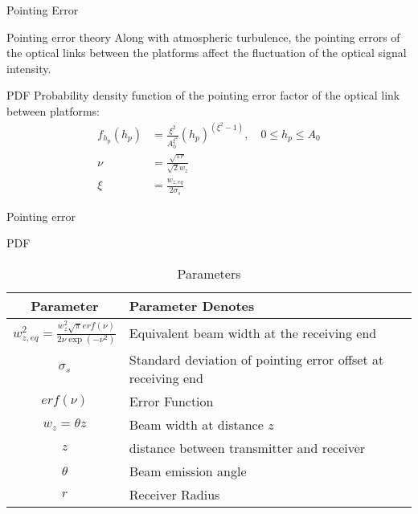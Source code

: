 \documentclass{beamer}
\begin{document}
\begin{frame}{Pointing Error}
    \begin{block}{Pointing error theory}
    Along with atmospheric turbulence, the pointing errors of the optical links between the platforms affect the fluctuation of the optical signal intensity.
    \end{block}
    \begin{block}{PDF}
    Probability density function of the pointing error factor of the optical link between platforms:
    \begin{align}
        f_{h_p}(h_p)&=\frac{\xi^2}{A_0^{\xi^2}}(h_p)^{(\xi^2-1)}, \quad {0\leq h_p \leq A_0}\\
        \nu&=\frac{\sqrt{\pi r}}{\sqrt{2}w_z}\\
    \xi &= \frac{w_{z,eq}}{2\sigma_s}
    \end{align}
    \end{block}
\end{frame}
\begin{frame}{Pointing error}
\begin{block}{PDF}
\begin{table}[]
    \centering
    \renewcommand{\arraystretch}{1.3}
    \begin{tabular}{|c|p{}|}
    \hline
    Parameter & Parameter Denotes\\ \hline
         $w_{z,eq}^2=\frac{w_z^2\sqrt{\pi}erf(\nu)}{2\nu\exp{(-\nu^2)}}$& Equivalent beam width at the receiving end\\ \hline
         $\sigma_s$& Standard deviation of pointing error offset at receiving end\\ \hline
         $erf(\nu)$& Error Function\\ \hline
         $w_z =\theta z$& Beam width at distance $z$\\ \hline
         $z$ & distance between transmitter and receiver\\ \hline
         $\theta$& Beam emission angle\\ \hline
        $r$ &Receiver Radius\\
         \hline
    \end{tabular}
    \caption{Parameters}
    \label{tab:my_label_2}
\end{table}
    
\end{block}
    
\end{frame}
\end{document}
